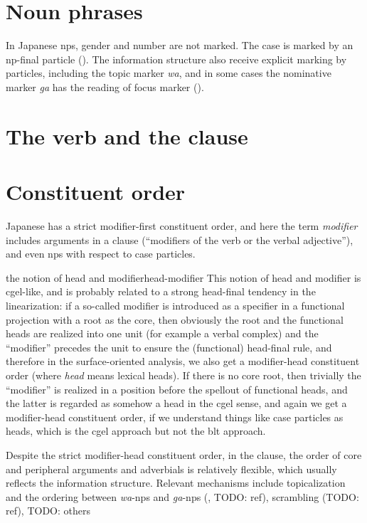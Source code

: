 \documentclass[UTF8, a4paper, oneside, scheme=plain]{ctexrep}
\newcommand*{\term}[1]{\emph{#1}}
\newcommand{\corpus}[1]{\emph{#1}}
\begin{document}
\section{Noun phrases}

In Japanese \acs{np}s, gender and number are not marked.
The case is marked by an \ac{np}-final particle ().
The information structure also receive explicit marking by particles,
including the topic marker \corpus{wa}, 
and in some cases the nominative marker \corpus{ga} has the reading of focus marker
().

\section{The verb and the clause}

\section{Constituent order}\label{sec:constituent-order}

Japanese has a strict modifier-first constituent order,
and here the term \term{modifier} includes 
arguments in a clause (``modifiers of the verb or the verbal adjective''),
and even \acs{np}s with respect to case particles.

\begin{theorybox}{the notion of head and modifier}{head-modifier}
    This notion of head and modifier is \acs{cgel}-like, 
    and is probably related to a strong head-final tendency in the linearization:
    if a so-called modifier is introduced as a specifier 
    in a functional projection with a root as the core,
    then obviously the root and the functional heads are realized into one unit (for example a verbal complex) 
    and the ``modifier'' precedes the unit to ensure the (functional) head-final rule,
    and therefore in the surface-oriented analysis,
    we also get a modifier-head constituent order (where \term{head} means lexical heads).
    If there is no core root,
    then trivially the ``modifier'' is realized in a position before the spellout of functional heads,
    and the latter is regarded as somehow a head in the \acs{cgel} sense,
    and again we get a modifier-head constituent order,
    if we understand things like case particles as heads,
    which is the \ac{cgel} approach but not the \acs{blt} approach.
\end{theorybox}

Despite the strict modifier-head constituent order,
in the clause, the order of core and peripheral arguments and adverbials is relatively flexible,
which usually reflects the information structure.
Relevant mechanisms include 
topicalization and the ordering between \corpus{wa}-\ac{np}s and \corpus{ga}-\ac{np}s 
(, TODO: ref), scrambling (TODO: ref), 
TODO: others
\end{document}
